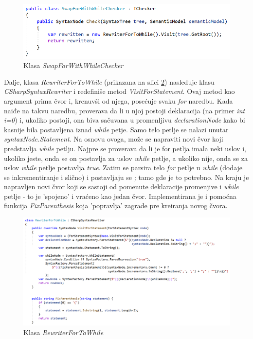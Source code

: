 \documentclass[a4paper]{article}
\begin{document}
{\begin{figure}[h!]
\begin{center}
\includegraphics[scale=0.70]{images/SwapForWithWhileChecker.png}
\end{center}
\caption{Klasa \textit{SwapForWithWhileChecker}}
\label{fig:SwapForWithWhileChecker}
\end{figure}

Dalje, klasa \textit{RewriterForToWhile} (prikazana na slici \ref{fig:RewriterForToWhile}) nasleđuje klasu \textit{CSharpSyntaxRewriter} i redefiniše metod \textit{VisitForStatement}. Ovaj metod kao argument prima čvor i, krenuvši od njega, posećuje svaku \textit{for} naredbu. Kada naiđe na takvu naredbu, proverava da li u njoj postoji deklaracija (na primer \textit{int i=0}) i, ukoliko postoji, ona biva sačuvana u promenljivu \textit{declarationNode} kako bi kasnije bila postavljena iznad \textit{while} petje. Samo telo petlje se nalazi unutar \textit{syntaxNode.Statement}. Na osnovu ovoga, može se napraviti novi čvor koji predstavlja \textit{while} petlju. Najpre se proverava da li je for petlja imala neki uslov i, ukoliko jeste, onda se on postavlja za uslov \textit{while} petlje, a ukoliko nije, onda se za uslov \textit{while} petlje postavlja \textit{true}. Zatim se parsira telo \textit{for} petlje u \textit{while} (dodaje se inkrementiranje i slično) i postavljaju se \textit{;} tamo gde je to potrebno. Na kraju je napravljen novi čvor koji se sastoji od pomenute deklaracije promenjive i \textit{while} petlje - to je 'spojeno' i vraćeno kao jedan čvor. Implementirana je i pomoćna funkcija \textit{FixParenthesis} koja 'popravlja' zagrade pre kreiranja novog čvora.

\begin{figure}[h!]
\begin{center}
\includegraphics[scale=0.44]{images/RewriterForToWhile.png}
\end{center}
\caption{Klasa \textit{RewriterForToWhile}}
\label{fig:RewriterForToWhile}
\end{figure}


}
\end{document}
